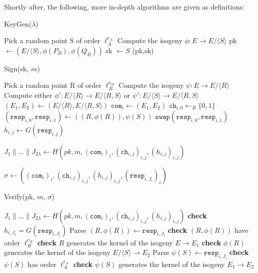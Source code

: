 Shortly after, the following, more in-depth algorithms are given as definitions: 

\begin{algorithm}
\caption{KeyGen($\lambda$)}\label{euclid}
\begin{algorithmic}[1]
\State Pick a random point S of order $\ell^{e_{A}}_{A}$
\State Compute the isogeny $\phi: E \rightarrow E/\langle S \rangle$
\State pk $\gets (E/\langle S \rangle, \phi(P_{B}), \phi(Q_{B}))$
\State sk $\gets S$
\State \Return (pk,sk)
\end{algorithmic}
\end{algorithm}

\begin{algorithm}
\caption{Sign(sk, $m$)}\label{euclid}
\begin{algorithmic}[1]
	\State Pick a random point R of order $\ell^{e_{B}}_{B}$
	\State Compute the isogeny $\psi: E \rightarrow E/\langle R \rangle$
	\State Compute either $\phi' : E/\langle R \rangle \rightarrow E/\langle R,S \rangle$ or $\psi' : E/\langle S \rangle \rightarrow E/\langle R,S \rangle$
	\State $(E_{1},E_{2}) \gets (E/\langle R \rangle, E/\langle R,S \rangle)$
	\State $\texttt{com}_{i} \gets (E_{1}, E_{2})$
	\State $\texttt{ch}_{i,0} \gets_{R} \{0,1\}$
	\State $(\texttt{resp}_{i,0}, \texttt{resp}_{i,1}) \gets ((R,\phi(R)), \psi(S))$
		\State $\texttt{swap}(\texttt{resp}_{i,0},\texttt{resp}_{i,1})$
	\EndIf
	\State $h_{i,j} \gets G(\texttt{resp}_{i,j})$
\EndFor

\State $J_{1} \parallel ... \parallel J_{2\lambda} \gets H(pk, m, (\texttt{com}_{i})_{i},(\texttt{ch}_{i,j})_{i,j},(h_{i,j})_{i,j})$

\State \Return $\sigma \gets ((\texttt{com}_{i})_{i}, (\texttt{ch}_{i,j})_{i,j}, (h_{i,j})_{i,j}, (\texttt{resp}_{i,J_{i}})_{i})$
\end{algorithmic}
\end{algorithm}

\begin{algorithm}[H]
\caption{Verify(pk, $m$, $\sigma$)}\label{euclid}
\begin{algorithmic}[1]
\State $J_{1} \parallel ... \parallel J_{2\lambda} \gets H(pk, m, (\texttt{com}_{i})_{i},(\texttt{ch}_{i,j})_{i,j},(h_{i,j})_{i,j})$
	\State \textbf{check} $h_{i,J_{i}} = G(\texttt{resp}_{i,J_{i}})$
		\State Parse $(R,\phi(R)) \gets \texttt{resp}_{i,J_{i}}$
		\State \textbf{check} $(R, \phi(R))$ have order $\ell^{e_{B}}_{B}$
		\State \textbf{check} $R$ generates the kernel of the isogeny $E \rightarrow E_{1}$
		\State \textbf{check} $\phi(R)$ generates the kernel of the isogeny $E/\langle S \rangle \rightarrow E_{2}$
	\Else
		\State Parse $\psi(S) \gets \texttt{resp}_{i,J_{i}}$
		\State \textbf{check} $\psi(S)$ has order $\ell^{e_{A}}_{A}$
		\State \textbf{check} $\psi(S)$ generates the kernel of the isogeny $E_{1} \rightarrow E_{2}$
	\EndIf
\EndFor

	\State {}
\EndIf
\end{algorithmic}
\end{algorithm}

